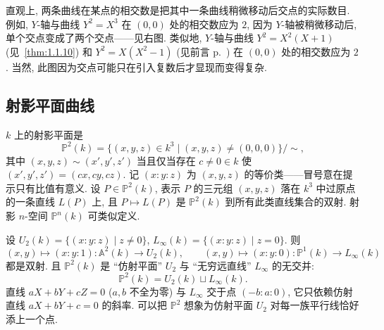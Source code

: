 \begin{aside} \label{thm:1.1.14} 
直观上, 两条曲线在某点的相交数是把其中一条曲线稍微移动后交点的实际数目. 例如, $Y$-轴与曲线 $Y^2 = X^3$ 在 $(0,0)$ 处的相交数应为 $2$, 因为 $Y$-轴被稍微移动后, 单个交点变成了两个交点——见右图. 类似地, $Y$-轴与曲线 $Y^2 = X^2(X+1)$ (见~\ref{thm:1.1.10}) 和 $Y^2 = X(X^2-1)$ (见前言 p.~\pageref{chapter:intro}) 在 $(0,0)$ 处的相交数应为 $2$. 当然, 此图因为交点可能只在引入复数后才显现而变得复杂.

\begin{center}
\end{center}
\end{aside}

\subsection*{射影平面曲线}

$k$ 上的射影平面是
\[
\mathbb{P}^2(k) = \{(x,y,z)\in k^3 \mid (x,y,z)\neq(0,0,0)\}/{\sim},
\]
其中 $(x,y,z)\sim(x',y',z')$ 当且仅当存在 $c\neq 0\in k$ 使 $(x',y',z') = (cx,cy,cz)$. 记 $(x:y:z)$ 为 $(x,y,z)$ 的等价类——冒号意在提示只有比值有意义. 设 $P\in\mathbb{P}^2(k)$, 表示 $P$ 的三元组 $(x,y,z)$ 落在 $k^3$ 中过原点的一条直线 $L(P)$ 上, 且 $P\mapsto L(P)$ 是 $\mathbb{P}^2(k)$ 到所有此类直线集合的双射. 射影 $n$-空间 $\mathbb{P}^n(k)$ 可类似定义.

设 $U_2(k) = \{(x:y:z) \mid z\neq 0\}$, $L_\infty(k) = \{(x:y:z) \mid z = 0\}$. 则
\[
(x,y)\mapsto(x:y:1)\colon\mathbb{A}^2(k)\to U_2(k), \qquad
(x,y)\mapsto(x:y:0)\colon\mathbb{P}^1(k)\to L_\infty(k)
\]
都是双射. 且 $\mathbb{P}^2(k)$ 是 ``仿射平面'' $U_2$ 与 ``无穷远直线'' $L_\infty$ 的无交并:
\[
\mathbb{P}^2(k) = U_2(k)\sqcup L_\infty(k).
\]
直线 $aX + bY + cZ = 0$ ($a,b$ 不全为零) 与 $L_\infty$ 交于点 $(-b:a:0)$, 它只依赖仿射直线 $aX + bY + c = 0$ 的斜率. 可以把 $\mathbb{P}^2$ 想象为仿射平面 $U_2$ 对每一族平行线恰好添上一个点.

